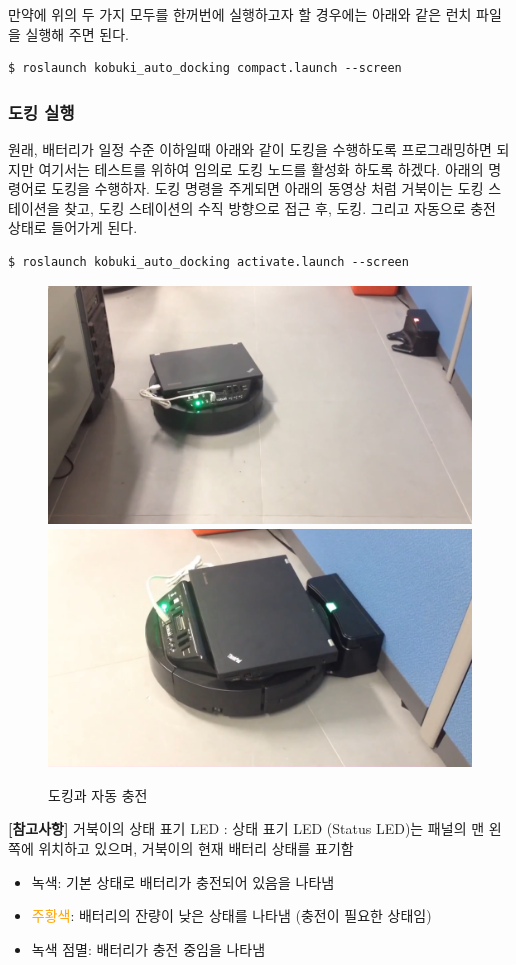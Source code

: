 만약에 위의 두 가지 모두를 한꺼번에 실행하고자 할 경우에는 아래와 같은 런치 파일을 실행해 주면 된다.

\vspace{\baselineskip}
\begin{lstlisting}[language=ROS]
$ roslaunch kobuki_auto_docking compact.launch --screen
\end{lstlisting} 

\subsubsection{도킹 실행}

원래, 배터리가 일정 수준 이하일때 아래와 같이 도킹을 수행하도록 프로그래밍하면 되지만 여기서는 테스트를 위하여 임의로 도킹 노드를 활성화 하도록 하겠다. 아래의 명령어로 도킹을 수행하자. 도킹 명령을 주게되면 아래의 동영상 처럼 거북이는 도킹 스테이션을 찾고, 도킹 스테이션의 수직 방향으로 접근 후, 도킹. 그리고 자동으로 충전 상태로 들어가게 된다.

\vspace{\baselineskip}
\begin{lstlisting}[language=ROS]
$ roslaunch kobuki_auto_docking activate.launch --screen
\end{lstlisting}

\begin{figure}[h]
\centering
\includegraphics[width=0.4\columnwidth]{pictures/chapter10/kobuki_docking1.png}
\includegraphics[width=0.4\columnwidth]{pictures/chapter10/kobuki_docking2.png}
\caption{도킹과 자동 충전}
\end{figure}


\vspace{\baselineskip}
\textbf{[참고사항]} 거북이의 상태 표기 LED : 상태 표기 LED (Status LED)는 패널의 맨 왼쪽에 위치하고 있으며, 거북이의 현재 배터리 상태를 표기함
\begin{itemize}[leftmargin=*]
\item {\color{limegreen}녹색}: 기본 상태로 배터리가 충전되어 있음을 나타냄
\item \textcolor{orange}{주황색}: 배터리의 잔량이 낮은 상태를 나타냄 (충전이 필요한 상태임)
\item {\color{limegreen}녹색 점멸}: 배터리가 충전 중임을 나타냄
\end{itemize}

